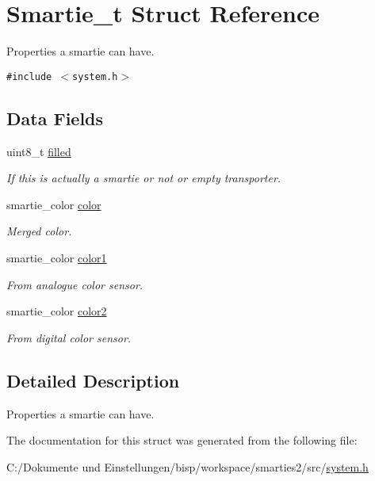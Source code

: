 \hypertarget{struct_smartie__t}{
\section{Smartie\_\-t Struct Reference}
\label{struct_smartie__t}
}
Properties a smartie can have.  


{\tt \#include $<$system.h$>$}

\subsection*{Data Fields}
\begin{CompactItemize}
\item 
\hypertarget{struct_smartie__t_21056205f4ed56f3945e1687555483f0}{
uint8\_\-t \hyperlink{struct_smartie__t_21056205f4ed56f3945e1687555483f0}{filled}}
\label{struct_smartie__t_21056205f4ed56f3945e1687555483f0}

\begin{CompactList}\small\item\em If this is actually a smartie or not or empty transporter. \item\end{CompactList}\item 
\hypertarget{struct_smartie__t_8f293a28e9bc4838b9603efed1fa34ff}{
smartie\_\-color \hyperlink{struct_smartie__t_8f293a28e9bc4838b9603efed1fa34ff}{color}}
\label{struct_smartie__t_8f293a28e9bc4838b9603efed1fa34ff}

\begin{CompactList}\small\item\em Merged color. \item\end{CompactList}\item 
\hypertarget{struct_smartie__t_29e89cafda23e366bd697ded9c58eec2}{
smartie\_\-color \hyperlink{struct_smartie__t_29e89cafda23e366bd697ded9c58eec2}{color1}}
\label{struct_smartie__t_29e89cafda23e366bd697ded9c58eec2}

\begin{CompactList}\small\item\em From analogue color sensor. \item\end{CompactList}\item 
\hypertarget{struct_smartie__t_c3b1d5995c1cf0f4bc58edae260f13a2}{
smartie\_\-color \hyperlink{struct_smartie__t_c3b1d5995c1cf0f4bc58edae260f13a2}{color2}}
\label{struct_smartie__t_c3b1d5995c1cf0f4bc58edae260f13a2}

\begin{CompactList}\small\item\em From digital color sensor. \item\end{CompactList}\end{CompactItemize}


\subsection{Detailed Description}
Properties a smartie can have. 

The documentation for this struct was generated from the following file:\begin{CompactItemize}
\item 
C:/Dokumente und Einstellungen/bisp/workspace/smarties2/src/\hyperlink{system_8h}{system.h}\end{CompactItemize}
